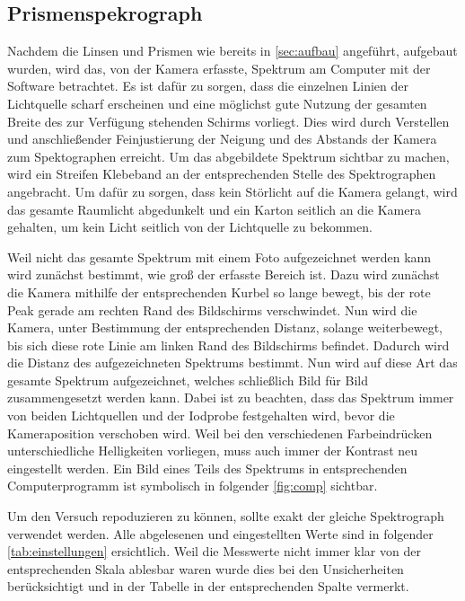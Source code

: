 \documentclass[12pt,english,ngerman]{scrartcl}
\begin{document}
\subsection{Prismenspekrograph}

Nachdem die Linsen und Prismen wie bereits in \autoref{sec:aufbau} angeführt, aufgebaut wurden,
wird das, von der Kamera erfasste, Spektrum am Computer mit der Software
betrachtet. Es ist dafür zu sorgen, dass die einzelnen Linien der Lichtquelle scharf erscheinen und
eine möglichst gute Nutzung der gesamten Breite des zur Verfügung stehenden Schirms vorliegt. Dies wird durch
Verstellen und anschließender Feinjustierung der Neigung und des Abstands der Kamera zum Spektographen 
erreicht. Um das abgebildete Spektrum sichtbar zu machen, wird ein Streifen Klebeband an der entsprechenden Stelle
des Spektrographen angebracht. Um dafür zu sorgen, dass kein Störlicht auf die Kamera gelangt, wird das gesamte
Raumlicht abgedunkelt und ein Karton seitlich an die Kamera gehalten, um kein Licht seitlich von der Lichtquelle zu bekommen.

Weil nicht das gesamte Spektrum mit einem Foto aufgezeichnet werden kann wird zunächst bestimmt, wie groß der 
erfasste Bereich ist. Dazu wird zunächst die Kamera mithilfe der entsprechenden Kurbel so lange bewegt, bis der
rote Peak gerade am rechten Rand des Bildschirms verschwindet. Nun wird die Kamera, unter Bestimmung der entsprechenden 
Distanz, solange weiterbewegt, bis sich diese rote Linie am linken Rand des Bildschirms befindet. Dadurch wird die 
Distanz des aufgezeichneten Spektrums bestimmt. Nun wird auf diese Art das gesamte Spektrum aufgezeichnet, welches
schließlich Bild für Bild zusammengesetzt werden kann. Dabei ist zu beachten, dass das Spektrum immer von beiden 
Lichtquellen und der Iodprobe festgehalten wird, bevor die Kameraposition verschoben wird. Weil bei den verschiedenen 
Farbeindrücken unterschiedliche Helligkeiten vorliegen, muss auch immer der Kontrast neu eingestellt werden.
Ein Bild eines Teils des Spektrums in entsprechenden Computerprogramm ist symbolisch in folgender \autoref{fig:comp} sichtbar.



Um den Versuch repoduzieren zu können, sollte exakt der gleiche Spektrograph verwendet werden. Alle abgelesenen und 
eingestellten Werte sind in folgender \autoref{tab:einstellungen} ersichtlich. Weil die Messwerte nicht immer klar
von der entsprechenden Skala ablesbar waren wurde dies bei den Unsicherheiten berücksichtigt und in der Tabelle in der
entsprechenden Spalte vermerkt.
\end{document}
